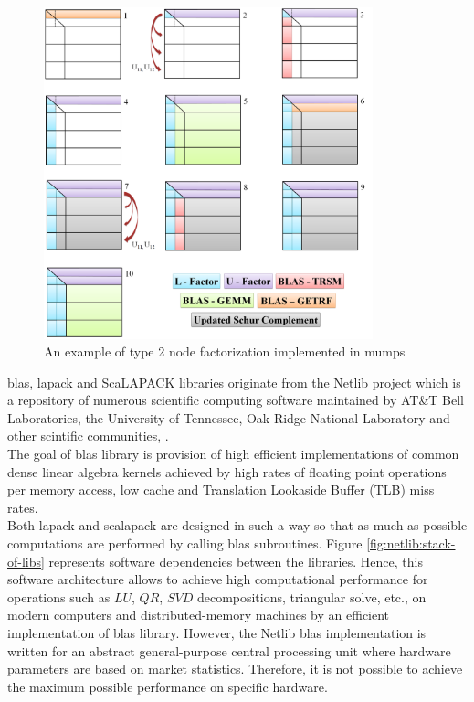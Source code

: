 \figpointer{\ref{fig:mumps:steps-of-type-2-factorization}}
\begin{figure}[htpb]
  \centering
  \includegraphics[width=0.85\textwidth]{figures/chapter-2/mumps-type-2-part-1.png}
\caption{An example of type 2 node factorization implemented in \acrshort{mumps}}
\label{fig:mumps:steps-of-type-2-factorization}
\end{figure}


\acrshort{blas}, \acrshort{lapack} and ScaLAPACK libraries originate from the Netlib project which is a repository of numerous scientific computing software maintained by AT\&T Bell Laboratories, the University of Tennessee, Oak Ridge National Laboratory and other scintific communities, \cite{netlib-overview}.\\


The goal of \acrshort{blas} library is provision of high efficient implementations of common dense linear algebra kernels achieved by high rates of floating point operations per memory access, low cache and Translation Lookaside Buffer (TLB) miss rates.\\


Both \acrshort{lapack} and \acrshort{scalapack} are designed in such a way so that as much as possible computations are performed by calling \acrshort{blas} subroutines. Figure \ref{fig:netlib:stack-of-libs} represents software dependencies between the libraries. Hence, this software architecture allows to achieve high computational performance for operations such as $LU$, $QR$, $SVD$ decompositions, triangular solve, etc., on modern computers and distributed-memory machines by an efficient implementation of \acrshort{blas} library. However, the Netlib \acrshort{blas} implementation is written for an abstract general-purpose central processing unit where hardware parameters are based on market statistics. Therefore, it is not possible to achieve the maximum possible performance on specific hardware.\\


